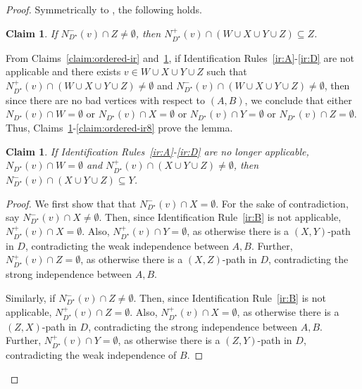\documentclass[a4paper,11pt]{article}
\theoremstyle{plain}
\newtheorem{claim}[theorem]{Claim}
\newtheorem{identification rule}{Identification Rule}
\theoremstyle{definition}
\theoremstyle{remark}
\newenvironment{claimproof}{\begin{proof}\renewcommand{\qedsymbol}{\claimqed}}{\end{proof}\renewcommand{\qedsymbol}{\plainqed}}
\let\plainqed\qedsymbol
\newcommand{\claimqed}{$\lrcorner$}
\begin{document}
\begin{proof}
Symmetrically to , the following holds.

\begin{claim}\label{claim:ordered-ir4}
If $N_{D^{\star}}^-(v) \cap Z \neq \emptyset$, then
$ N_{D^{\star}}^+(v) \cap (W \cup X \cup Y \cup Z) \subseteq Z$. 
\end{claim}

From Claims~\ref{claim:ordered-ir} and~\ref{claim:ordered-ir4}, if Identification Rules~\ref{ir:A}-\ref{ir:D} are not applicable and there exists $v \in W \cup X \cup Y \cup Z$ such that $N_{D^{\star}}^+(v) \cap (W \cup X \cup Y \cup Z) \neq \emptyset$ and $N_{D^{\star}}^-(v) \cap (W \cup X \cup Y \cup Z) \neq \emptyset$, then since there are no bad vertices with respect to $(A,B)$, we conclude that either $N_{D^{\star}}(v) \cap W =\emptyset$ or $N_{D^{\star}}(v) \cap X =\emptyset$ or $N_{D^{\star}}(v) \cap Y=\emptyset$ or $N_{D^{\star}}(v) \cap Z =\emptyset$. Thus, Claims~\ref{claim:ordered-ir5}-\ref{claim:ordered-ir8} prove the lemma.

\begin{claim}\label{claim:ordered-ir5}
If Identification Rules~\ref{ir:A}-\ref{ir:D} are no longer applicable, $N_{D^{\star}}(v) \cap W=\emptyset$ and  $N_{D^{\star}}^+(v) \cap (X \cup Y \cup Z) \neq \emptyset$, then $N_{D^{\star}}^-(v) \cap (X \cup Y \cup Z) \subseteq Y$.
\end{claim}

\begin{claimproof}
We first show that that $N_{D^{\star}}^-(v) \cap X = \emptyset$. 
For the sake of contradiction, say $N_{D^{\star}}^-(v) \cap X \neq \emptyset$. 
Then, since Identification Rule~\ref{ir:B} is not applicable, $N_{D^{\star}}^+(v) \cap X = \emptyset$.  Also, $N_{D^{\star}}^+(v) \cap Y = \emptyset$, as otherwise there is a $(X,Y)$-path in $D$, contradicting the weak independence between $A,B$. Further, $N_{D^{\star}}^+(v) \cap Z = \emptyset$, as otherwise there is a $(X,Z)$-path in $D$, contradicting the strong independence between $A,B$.

Similarly, if $N_{D^{\star}}^-(v) \cap Z \neq \emptyset$. 
Then, since Identification Rule~\ref{ir:B} is not applicable, $N_{D^{\star}}^+(v) \cap Z = \emptyset$.  Also, 
$N_{D^{\star}}^+(v) \cap X = \emptyset$, as otherwise there is a $(Z,X)$-path in $D$, contradicting the strong independence between $A,B$. Further, 
$N_{D^{\star}}^+(v) \cap Y = \emptyset$, as otherwise there is a $(Z,Y)$-path in $D$, contradicting the weak independence of $B$.
\end{claimproof}


\end{proof}
\end{document}
